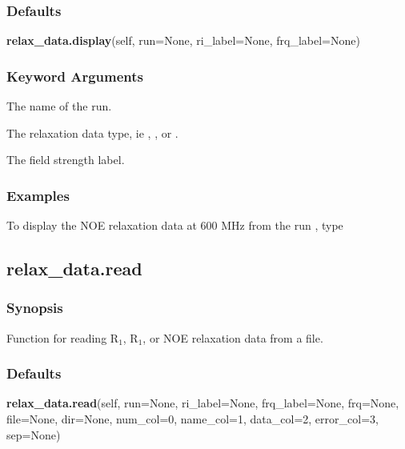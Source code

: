 \subsubsection{Defaults}

\textsf{\textbf{relax\_data.display}(self, run=None, ri\_label=None, frq\_label=None)}


\subsubsection{Keyword Arguments}

  The name of the run. 

  The relaxation data type, ie , , or . 

  The field strength label. 




\subsubsection{Examples}

To display the NOE relaxation data at 600 MHz from the run , type





\newpage

\subsection{relax\_data.read}


\subsubsection{Synopsis}

Function for reading R$_1$, R$_1$, or NOE relaxation data from a file.



\subsubsection{Defaults}

\textsf{\textbf{relax\_data.read}(self, run=None, ri\_label=None, frq\_label=None, frq=None, file=None, dir=None, num\_col=0, name\_col=1, data\_col=2, error\_col=3, sep=None)}



